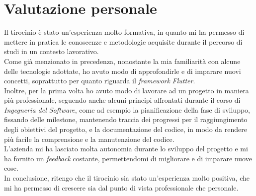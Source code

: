 \section{Valutazione personale}
\label{sec:valutazione-personale}

Il tirocinio è stato un'esperienza molto formativa, in quanto mi ha permesso di mettere in pratica le conoscenze e metodologie acquisite durante il percorso di studi in un contesto lavorativo.\\
Come già menzionato in precedenza, nonostante la mia familiarità con alcune delle tecnologie adottate, ho avuto modo di approfondirle e di imparare nuovi concetti, soprattutto per quanto riguarda il \emph{framework} \emph{Flutter}.\\
Inoltre, per la prima volta ho avuto modo di lavorare ad un progetto in maniera più professionale, seguendo anche alcuni principi affrontati durante il corso di \emph{Ingegneria del Software}, come ad esempio la pianificazione della fase di sviluppo, fissando delle \gls{milestone}\glsoccur, mantenendo traccia dei progressi per il raggiungimento degli obiettivi del progetto, e la documentazione del codice, in modo da rendere più facile la comprensione e la manutenzione del codice.\\  
L'azienda mi ha lasciato molta autonomia durante lo sviluppo del progetto e mi ha fornito un \emph{feedback} costante, permettendomi di migliorare e di imparare nuove cose. \\
In conclusione, ritengo che il tirocinio sia stato un'esperienza molto positiva, che mi ha permesso di crescere sia dal punto di vista professionale che personale.